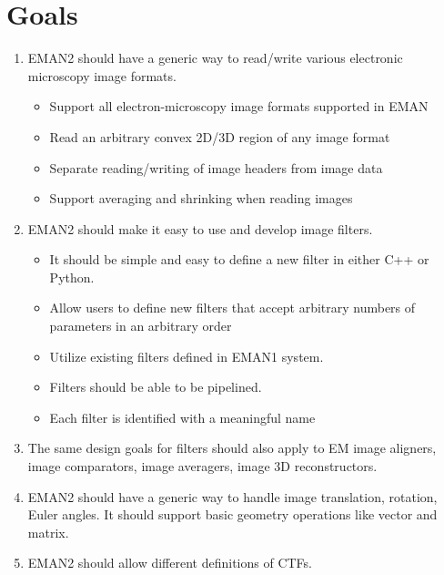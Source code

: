 %

\section{Goals}
  \label{GOALS}

\begin{enumerate}
  \item 
    EMAN2 should have a generic way to read/write various electronic
    microscopy image formats.
    \begin{itemize}
      \item
	Support all electron-microscopy image formats supported in EMAN
      \item
	Read an arbitrary convex 2D/3D region of any image format
      \item
	Separate reading/writing of image headers from image data
      \item
	Support averaging and shrinking when reading images
    \end{itemize}

    \item
      EMAN2 should make it easy to use and develop image filters.
      \begin{itemize}
	\item
	  It should be simple and easy to define a new filter in
	  either C++ or Python.
	\item
	  Allow users to define new filters that accept arbitrary numbers
	  of parameters in an arbitrary order
	\item
	  Utilize existing filters defined in EMAN1 system.
	\item
	  Filters should be able to be pipelined.
	\item
	  Each filter is identified with a meaningful name
      \end{itemize}

    \item
      The same design goals for filters should also apply to EM image
      aligners, image comparators, image averagers, image 3D
      reconstructors.

    \item
      EMAN2 should have a generic way to handle image translation,
      rotation, Euler angles. It should support basic geometry
      operations like vector and matrix.

    \item
      EMAN2 should allow different definitions of CTFs.


\end{enumerate}
